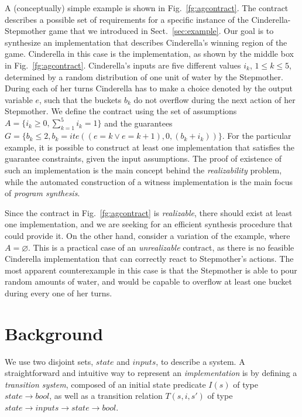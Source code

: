 A (conceptually) simple example is shown in Fig.~\ref{fg:agcontract}. The contract describes a possible set of requirements for a specific instance of the Cinderella-Stepmother game that we introduced in Sect.~\ref{sec:example}. Our goal is to synthesize an implementation that describes Cinderella's winning region of the game. Cinderella in this case is the implementation, as shown by the middle box in Fig.~\ref{fg:agcontract}. Cinderella's inputs are five different values $i_k$, $1 \leq k \leq 5$, determined by a random distribution of one unit of water by the Stepmother. During each of her turns Cinderella has to make a choice denoted by the output variable $e$, such that the buckets $b_k$ do not overflow during the next action of her Stepmother. We define the contract using the set of assumptions $A = \{i_k \geq 0, \sum_{k=1}^{5} i_k = 1\}$ and the guarantees $G = \{b_k \leq 2, b_k = ite((e=k \lor e=k+1), 0, (b_k+i_k))\}$. For the particular example, it is possible to construct at least one implementation that satisfies the guarantee constraints, given the input assumptions. The proof of existence of such an implementation is the main concept behind the \emph{realizability} problem, while the automated construction of a witness implementation is the main focus of \emph{program synthesis}.


Since the contract in Fig.~\ref{fg:agcontract} is \emph{realizable}, there should exist at least one implementation, and we 
are seeking for an efficient synthesis procedure that could provide it.
On the other hand, consider a variation of the example, where $A = \varnothing$. This is a practical case of an
\emph{unrealizable} contract, as there is no feasible Cinderella implementation that can correctly react to Stepmother's actions. The most apparent counterexample in this case is that the Stepmother is able to pour random amounts of water, and would be capable to overflow at least one bucket during every one of her turns.

\section{Background}
\label{sec:background}
We use two disjoint sets, $state$ and $inputs$, to describe a system.
A straightforward and intuitive way to represent an \emph{implementation} is by
defining a \emph{transition system}, composed of an initial state
predicate $I(s)$ of type $state \to bool$, as well as a transition relation
$T(s,i,s')$ of type $state \to inputs \to state \to bool$.

